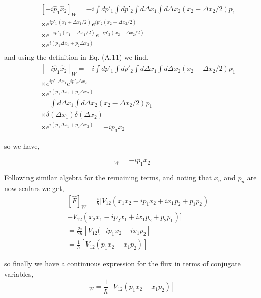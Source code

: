 \documentclass[phd,tocprelim]{cornell}
\begin{document}
\begin{eqnarray}
&&[-i\hat{p}_1\hat{x}_2]_W= -i\int dp'_1 \int dp'_2  \int d \Delta x_1 \int d \Delta x_2 
 ({x}_2-\Delta {x}_{2}/{2})p_1
\\ 
\nonumber
&& \times
e^{ip'_1({x}_1+\Delta {x}_{1}/{2})}e^{ip'_2({x}_2+\Delta {x}_{2}/{2})}
\\ 
\nonumber
&& \times
e^{-ip'_1({x}_1-\Delta {x}_{1}/{2})}e^{-ip'_2({x}_2-\Delta {x}_{2}/{2})}
\\ 
\nonumber
&& \times
e^{i(p_1\Delta x_1+p_2\Delta x_2)}\\
\end{eqnarray}
and using the definition in Eq. (A.11) we find, 
\begin{eqnarray}
&&[-i\hat{p}_1\hat{x}_2]_W= -i\int dp'_1 \int dp'_2 \int d \Delta x_1 \int d \Delta x_2  ({x}_2-\Delta {x}_{2}/{2})p_1
\\ 
\nonumber
&& \times
e^{ip'_1\Delta {x}_{1}}e^{ip'_2\Delta {x}_{2}}
\\ 
\nonumber
&& \times
e^{i(p_1\Delta x_1+p_2\Delta x_2)}
\\ 
\nonumber
&&=
\int d \Delta x_1 \int d \Delta x_2  ({x}_2-\Delta {x}_{2}/{2})p_1
\\ 
\nonumber
&& \times
\delta(\Delta {x}_{1})\delta(\Delta {x}_{2})
\\ 
\nonumber
&& \times
e^{i(p_1\Delta x_1+p_2\Delta x_2)}= -i  p_1x_2
\end{eqnarray}

so we have, 

\begin{equation}
[-i\hat{p}_1\hat{x}_2]_W=-i  p_1x_2
\end{equation}

Following similar algebra for the remaining terms, and noting that $x_n$ and $p_n$ are now scalars we get, 
\begin{eqnarray}
&&[\hat{F}]_W  = \frac{i}{\hbar}[V_{12}({x}_1{x}_2-i{p}_1 {x}_2+i {x}_1{p}_2+ {p}_1 {p}_2)
\\ 
\nonumber
&&-V_{12}({x}_2 {x}_1-i{p}_2{x}_1+i{x}_1 {p}_2+{p}_2 {p}_1)]
\\ 
\nonumber
&&=
 \frac{2i}{2\hbar}[V_{12}(-i{p}_1 {x}_2+i {x}_1{p}_2]
 \\ 
\nonumber
&&=
 \frac{1}{\hbar}[V_{12}({p}_1 {x}_2- {x}_1{p}_2)]
\end{eqnarray}

so finally we have a continuous expression for the flux in terms of conjugate variables, 
\begin{equation}
[\hat{F}]_W  =  \frac{1}{\hbar}[V_{12}({p}_1 {x}_2- {x}_1{p}_2)]
\end{equation}
\end{document}
